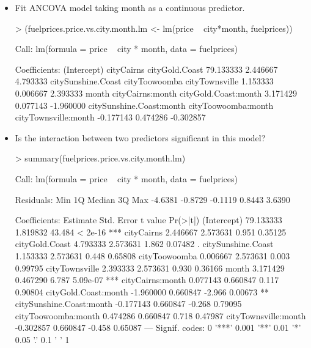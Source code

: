 \documentclass[a4paper]{article}
\begin{document}
\begin{itemize}
\item Fit ANCOVA model taking month  as a continuous predictor.
\begin{Schunk}
\begin{Sinput}
> (fuelprices.price.vs.city.month.lm <- lm(price ~ city*month, fuelprices))
\end{Sinput}
\begin{Soutput}
Call:
lm(formula = price ~ city * month, data = fuelprices)

Coefficients:
             (Intercept)                cityCairns            cityGold.Coast  
               79.133333                  2.446667                  4.793333  
      citySunshine.Coast             cityToowoomba            cityTownsville  
                1.153333                  0.006667                  2.393333  
                   month          cityCairns:month      cityGold.Coast:month  
                3.171429                  0.077143                 -1.960000  
citySunshine.Coast:month       cityToowoomba:month      cityTownsville:month  
               -0.177143                  0.474286                 -0.302857  
\end{Soutput}
\end{Schunk}

\item  Is the interaction between two predictors significant in this model?
\begin{Schunk}
\begin{Sinput}
> summary(fuelprices.price.vs.city.month.lm)	
\end{Sinput}
\begin{Soutput}
Call:
lm(formula = price ~ city * month, data = fuelprices)

Residuals:
    Min      1Q  Median      3Q     Max 
-4.6381 -0.8729 -0.1119  0.8443  3.6390 

Coefficients:
                          Estimate Std. Error t value Pr(>|t|)    
(Intercept)              79.133333   1.819832  43.484  < 2e-16 ***
cityCairns                2.446667   2.573631   0.951  0.35125    
cityGold.Coast            4.793333   2.573631   1.862  0.07482 .  
citySunshine.Coast        1.153333   2.573631   0.448  0.65808    
cityToowoomba             0.006667   2.573631   0.003  0.99795    
cityTownsville            2.393333   2.573631   0.930  0.36166    
month                     3.171429   0.467290   6.787 5.09e-07 ***
cityCairns:month          0.077143   0.660847   0.117  0.90804    
cityGold.Coast:month     -1.960000   0.660847  -2.966  0.00673 ** 
citySunshine.Coast:month -0.177143   0.660847  -0.268  0.79095    
cityToowoomba:month       0.474286   0.660847   0.718  0.47987    
cityTownsville:month     -0.302857   0.660847  -0.458  0.65087    
---
Signif. codes:  0 '***' 0.001 '**' 0.01 '*' 0.05 '.' 0.1 ' ' 1


\end{Soutput}
\end{Schunk}
\end{itemize}
\end{document}
